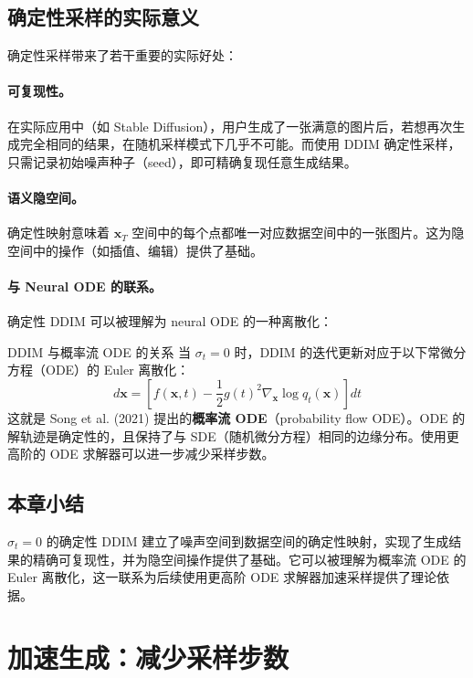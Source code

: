 \documentclass[a4paper]{article}
\begin{document}
\subsection{确定性采样的实际意义}

确定性采样带来了若干重要的实际好处：

\paragraph{可复现性。} 在实际应用中（如 Stable Diffusion），用户生成了一张满意的图片后，若想再次生成完全相同的结果，在随机采样模式下几乎不可能。而使用 DDIM 确定性采样，只需记录初始噪声种子（seed），即可精确复现任意生成结果。

\paragraph{语义隐空间。} 确定性映射意味着 $\mathbf{x}_T$ 空间中的每个点都唯一对应数据空间中的一张图片。这为隐空间中的操作（如插值、编辑）提供了基础。

\paragraph{与 Neural ODE 的联系。} 确定性 DDIM 可以被理解为 neural ODE 的一种离散化：

\begin{knowledgebox}{DDIM 与概率流 ODE 的关系}
当 $\sigma_t = 0$ 时，DDIM 的迭代更新对应于以下常微分方程（ODE）的 Euler 离散化：
$$
d\mathbf{x} = \left[f(\mathbf{x}, t) - \frac{1}{2}g(t)^2 \nabla_\mathbf{x} \log q_t(\mathbf{x})\right] dt
$$
这就是 Song et al. (2021) 提出的\textbf{概率流 ODE}（probability flow ODE）。ODE 的解轨迹是确定性的，且保持了与 SDE（随机微分方程）相同的边缘分布。使用更高阶的 ODE 求解器可以进一步减少采样步数。
\end{knowledgebox}

\subsection{本章小结}

$\sigma_t=0$ 的确定性 DDIM 建立了噪声空间到数据空间的确定性映射，实现了生成结果的精确可复现性，并为隐空间操作提供了基础。它可以被理解为概率流 ODE 的 Euler 离散化，这一联系为后续使用更高阶 ODE 求解器加速采样提供了理论依据。


\section{加速生成：减少采样步数}
\end{document}
